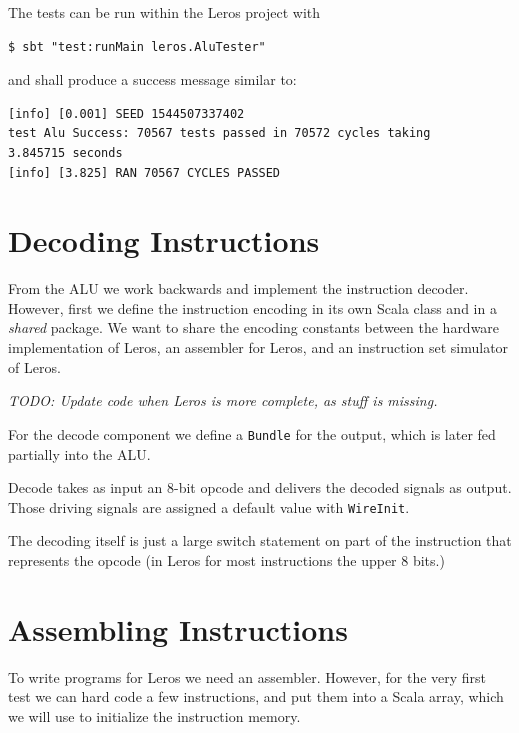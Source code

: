 \documentclass[%
    10pt, %
    headinclude, footexclude,
    openright, %
    notitlepage,
    cleardoubleempty,
    headsepline,
    pointlessnumbers,
    bibtotoc, idxtotoc,
    ]{scrbook}
\newcommand{\code}[1]{{\small{\texttt{#1}}}}
\newcommand{\todo}[1]{{\emph{TODO: #1}}}
\begin{document}


\noindent The tests can be run within the Leros project with

\begin{verbatim}
$ sbt "test:runMain leros.AluTester"
\end{verbatim}

and shall produce a success message similar to:

\begin{verbatim}
[info] [0.001] SEED 1544507337402
test Alu Success: 70567 tests passed in 70572 cycles taking
3.845715 seconds
[info] [3.825] RAN 70567 CYCLES PASSED
\end{verbatim}

\section{Decoding Instructions}

From the ALU we work backwards and implement the instruction decoder.
However, first we define the instruction encoding in its own Scala class and in
a \emph{shared} package. We want to share the encoding constants between
the hardware implementation of Leros, an assembler for Leros, and an instruction
set simulator of Leros.



\todo{Update code when Leros is more complete, as stuff is missing.}

\noindent For the decode component we define a \code{Bundle} for the output,
which is later fed partially into the ALU.



\noindent Decode takes as input an 8-bit opcode and delivers the decoded signals
as output. Those driving signals are assigned a default value with \code{WireInit}.



\noindent The decoding itself is just a large switch statement on part of the
instruction that represents the opcode (in Leros for most instructions the upper
8 bits.)



\section{Assembling Instructions}

To write programs for Leros we need an assembler. However, for the very first
test we can hard code a few instructions, and put them into a Scala array,
which we will use to initialize the instruction memory.
\end{document}
